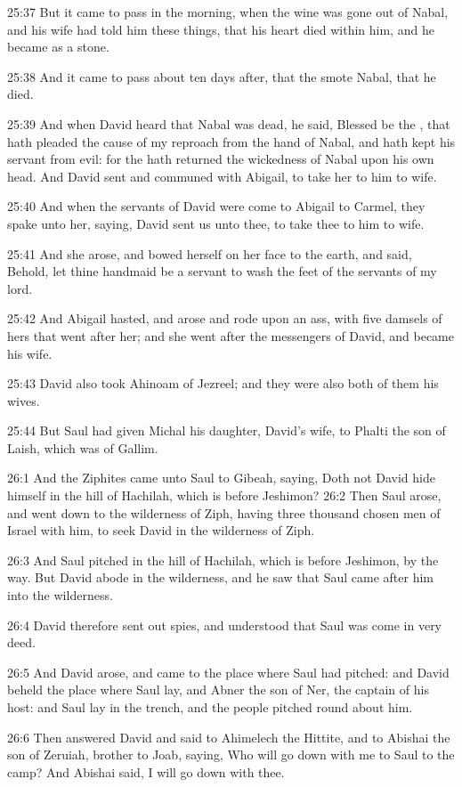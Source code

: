 25:37 But it came to pass in the morning, when the wine was gone out of Nabal, and his wife had told him these things, that his heart died within him, and he became as a stone.

25:38 And it came to pass about ten days after, that the \LORD smote Nabal, that he died.

25:39 And when David heard that Nabal was dead, he said, Blessed be the \LORD, that hath pleaded the cause of my reproach from the hand of Nabal, and hath kept his servant from evil: for the \LORD hath returned the wickedness of Nabal upon his own head. And David sent and communed with Abigail, to take her to him to wife.

25:40 And when the servants of David were come to Abigail to Carmel, they spake unto her, saying, David sent us unto thee, to take thee to him to wife.

25:41 And she arose, and bowed herself on her face to the earth, and said, Behold, let thine handmaid be a servant to wash the feet of the servants of my lord.

25:42 And Abigail hasted, and arose and rode upon an ass, with five damsels of hers that went after her; and she went after the messengers of David, and became his wife.

25:43 David also took Ahinoam of Jezreel; and they were also both of them his wives.

25:44 But Saul had given Michal his daughter, David's wife, to Phalti the son of Laish, which was of Gallim.

26:1 And the Ziphites came unto Saul to Gibeah, saying, Doth not David hide himself in the hill of Hachilah, which is before Jeshimon?  26:2 Then Saul arose, and went down to the wilderness of Ziph, having three thousand chosen men of Israel with him, to seek David in the wilderness of Ziph.

26:3 And Saul pitched in the hill of Hachilah, which is before Jeshimon, by the way. But David abode in the wilderness, and he saw that Saul came after him into the wilderness.

26:4 David therefore sent out spies, and understood that Saul was come in very deed.

26:5 And David arose, and came to the place where Saul had pitched: and David beheld the place where Saul lay, and Abner the son of Ner, the captain of his host: and Saul lay in the trench, and the people pitched round about him.

26:6 Then answered David and said to Ahimelech the Hittite, and to Abishai the son of Zeruiah, brother to Joab, saying, Who will go down with me to Saul to the camp? And Abishai said, I will go down with thee.

